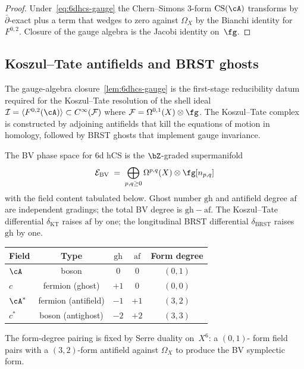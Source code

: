 \begin{proof}
Under~\eqref{eq:6dhcs-gauge} the Chern--Simons 3-form
$\mathrm{CS}(\cA)$ transforms by $\bar\partial$-exact plus a term
that wedges to zero against $\Omega_X$ by the Bianchi identity for
$F^{0,2}$. Closure of the gauge algebra is the Jacobi identity
on~$\fg$.
\end{proof}

\subsection{Koszul--Tate antifields and BRST ghosts}
\label{subsec:6dhcs-kt-complex}

The gauge-algebra closure~\ref{lem:6dhcs-gauge} is the first-stage
reducibility datum required for the Koszul--Tate resolution of the
shell ideal $\mathcal{I} = \langle F^{0,2}(\cA)\rangle \subset
C^\infty(\mathcal{F})$ where $\mathcal{F} = \Omega^{0,1}(X) \otimes
\fg$. The Koszul--Tate complex is constructed by adjoining
antifields that kill the equations of motion in homology, followed
by BRST ghosts that implement gauge invariance.

\begin{definition}
\label{def:6dhcs-bv-field-content}
The BV phase space for 6d hCS is the $\bZ$-graded supermanifold
\begin{equation}\label{eq:6dhcs-bv-phase-space}
 \mathcal{E}_{\mathrm{BV}}
 \;=\;
 \bigoplus_{p,q \geq 0}
 \Omega^{p,q}(X) \otimes \fg[n_{p,q}]
\end{equation}
with the field content tabulated below. Ghost number $\mathrm{gh}$ and
antifield degree $\mathrm{af}$ are independent gradings; the total BV
degree is $\mathrm{gh} - \mathrm{af}$. The Koszul--Tate differential
$\delta_{\mathrm{KT}}$ raises $\mathrm{af}$ by one; the longitudinal
BRST differential $\delta_{\mathrm{BRST}}$ raises $\mathrm{gh}$ by one.
\begin{center}
\begin{tabular}{lcccc}
\hline
Field & Type & $\mathrm{gh}$ & $\mathrm{af}$ & Form degree \\
\hline
$\cA$ & boson & $0$ & $0$ & $(0,1)$ \\
$c$ & fermion (ghost) & $+1$ & $0$ & $(0,0)$ \\
$\cA^*$ & fermion (antifield) & $-1$ & $+1$ & $(3,2)$ \\
$c^*$ & boson (antighost) & $-2$ & $+2$ & $(3,3)$ \\
\hline
\end{tabular}
\end{center}
The form-degree pairing is fixed by Serre duality on~$X^6$: a $(0,1)$-
form field pairs with a $(3,2)$-form antifield against $\Omega_X$ to
produce the BV symplectic form.
\end{definition}

